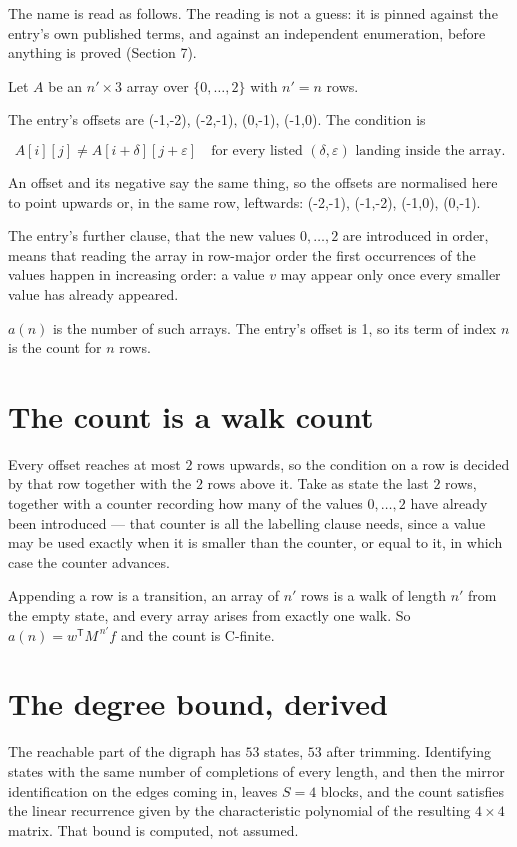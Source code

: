 \documentclass[11pt]{article}
\theoremstyle{definition}
\begin{document}
The name is read as follows. The reading is not a guess: it is pinned against the entry's own published terms, and against an independent enumeration, before anything is proved (Section 7).

Let $A$ be an $n' \times 3$ array over $\{0,\dots,2\}$ with $n' = n$ rows.

The entry's offsets are (-1,-2), (-2,-1), (0,-1), (-1,0). The condition is

\[A[i][j] \ne A[i{+}\delta][j{+}\varepsilon]\quad\text{for every listed }(\delta,\varepsilon)\text{ landing inside the array.}\]

An offset and its negative say the same thing, so the offsets are normalised here to point upwards or, in the same row, leftwards: (-2,-1), (-1,-2), (-1,0), (0,-1).

The entry's further clause, that the new values $0,\dots,2$ are introduced in order, means that reading the array in row-major order the first occurrences of the values happen in increasing order: a value $v$ may appear only once every smaller value has already appeared.

$a(n)$ is the number of such arrays. The entry's offset is 1, so its term of index $n$ is the count for $n$ rows.

\section{The count is a walk count}

Every offset reaches at most $2$ rows upwards, so the condition on a row is decided by that row together with the $2$ rows above it. Take as state the last $2$ rows, together with a counter recording how many of the values $0,\dots,2$ have already been introduced --- that counter is all the labelling clause needs, since a value may be used exactly when it is smaller than the counter, or equal to it, in which case the counter advances.

Appending a row is a transition, an array of $n'$ rows is a walk of length $n'$ from the empty state, and every array arises from exactly one walk. So $a(n) = w^{\mathsf T}M^{\,n'}f$ and the count is C-finite.

\section{The degree bound, derived}

The reachable part of the digraph has $53$ states, $53$ after trimming. Identifying states with the same number of completions of every length, and then the mirror identification on the edges coming in, leaves $S = 4$ blocks, and the count satisfies the linear recurrence given by the characteristic polynomial of the resulting $4\times4$ matrix. That bound is computed, not assumed.
\end{document}
